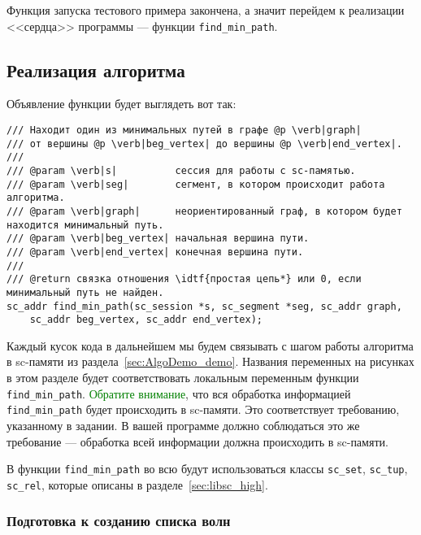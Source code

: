 Функция запуска тестового примера закончена, а значит перейдем к
реализации <<сердца>> программы --- функции \lstinline|find_min_path|.

\subsection{Реализация алгоритма}
\label{sec:libscprg_find_min_path}

Объявление функции будет выглядеть вот так:
\begin{lstlisting}[texcl]
/// Находит один из минимальных путей в графе @p \verb|graph|
/// от вершины @p \verb|beg_vertex| до вершины @p \verb|end_vertex|.
///
/// @param \verb|s|          сессия для работы с sc-памятью.
/// @param \verb|seg|        сегмент, в котором происходит работа алгоритма.
/// @param \verb|graph|      неориентированный граф, в котором будет находится минимальный путь.
/// @param \verb|beg_vertex| начальная вершина пути.
/// @param \verb|end_vertex| конечная вершина пути.
///
/// @return связка отношения \idtf{простая цепь*} или 0, если минимальный путь не найден.
sc_addr find_min_path(sc_session *s, sc_segment *seg, sc_addr graph,
    sc_addr beg_vertex, sc_addr end_vertex);
\end{lstlisting}

Каждый кусок кода в дальнейшем мы будем связывать с шагом работы
алгоритма в sc-памяти из раздела~\ref{sec:AlgoDemo_demo}. Названия
переменных на рисунках в этом разделе будет соответствовать локальным
переменным функции
\lstinline|find_min_path|. \textcolor{green}{Обратите внимание}, что
вся обработка информацией \lstinline|find_min_path| будет происходить
в sc-памяти. Это соответствует требованию, указанному в задании. В
вашей программе должно соблюдаться это же требование --- обработка
всей информации должна происходить в sc-памяти.

В функции \lstinline|find_min_path| во всю будут использоваться классы
\lstinline|sc_set|, \lstinline|sc_tup|, \lstinline|sc_rel|, которые
описаны в разделе~\ref{sec:libsc_high}.

\subsubsection{Подготовка к созданию списка волн}
\label{sec:libscprg_fmp_before_waves_list}

